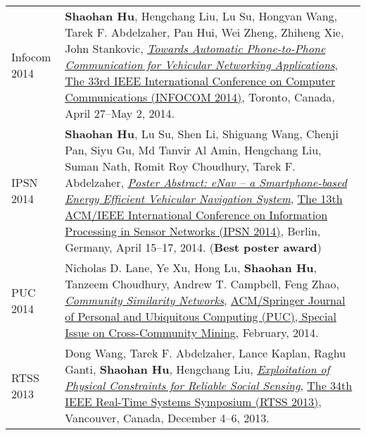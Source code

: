 \begin{longtabu}{p{.51\sectionwidth} p{.78\resumewidth}}
{\sc Infocom 2014}\hypertarget{hu2014infocom}{} &
\textbf{Shaohan Hu}, Hengchang Liu, Lu Su, Hongyan Wang, Tarek F. Abdelzaher, Pan Hui, Wei Zheng, Zhiheng Xie, John Stankovic,
\href{http://ieeexplore.ieee.org/document/6848113}{\emph{Towards Automatic Phone-to-Phone Communication for Vehicular Networking Applications}},
\href{http://infocom2014.ieee-infocom.org}{\textsf{The 33rd IEEE International Conference on Computer Communications (INFOCOM 2014)}},
Toronto, Canada, April 27--May 2, 2014. \\


{\sc IPSN 2014}\hypertarget{hu2014ipsn}{} &
\textbf{Shaohan Hu}, Lu Su, Shen Li, Shiguang Wang, Chenji Pan, Siyu Gu, Md Tanvir Al Amin, Hengchang Liu, Suman Nath, Romit Roy Choudhury, Tarek F. Abdelzaher,
\href{http://dl.acm.org/citation.cfm?id=2602374}{\emph{Poster Abstract: eNav -- a Smartphone-based Energy Efficient Vehicular Navigation System}},
\href{http://ipsn.acm.org/2014/}{\textsf{The 13th ACM/IEEE International Conference on Information Processing in Sensor Networks (IPSN 2014)}},
Berlin, Germany, April 15--17, 2014. (\textbf{Best poster award}) \\

{\sc PUC 2014}\hypertarget{lane2013puc}{} &
Nicholas D. Lane, Ye Xu, Hong Lu, \textbf{Shaohan Hu}, Tanzeem Choudhury, Andrew T. Campbell, Feng Zhao,
\href{http://link.springer.com/article/10.1007/s00779-013-0655-1}{\emph{Community Similarity Networks}},
\href{http://www.springer.com/computer/hci/journal/779}{\textsf{ACM/Springer Journal of Personal and Ubiquitous Computing (PUC), Special Issue on Cross-Community Mining}},
February, 2014. \\

{\sc RTSS 2013}\hypertarget{wang2013rtss}{} &
Dong Wang, Tarek F. Abdelzaher, Lance Kaplan, Raghu Ganti, \textbf{Shaohan Hu}, Hengchang Liu,
\href{http://ieeexplore.ieee.org/document/6728876}{\emph{Exploitation of Physical Constraints for Reliable Social Sensing}},
\href{http://2013.ieee-rtss.org/}{\textsf{The 34th IEEE Real-Time Systems Symposium (RTSS 2013)}},
Vancouver, Canada, December 4--6, 2013. \\


\end{longtabu}

